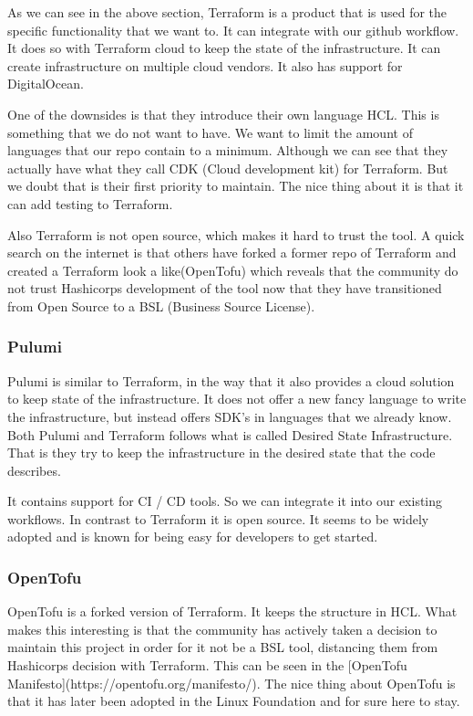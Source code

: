 As we can see in the above section, Terraform is a product that is used for the specific functionality that we want to. It can integrate with our github workflow. It does so with Terraform cloud to keep the state of the infrastructure. It can create infrastructure on multiple cloud vendors. It also has support for DigitalOcean.

One of the downsides is that they introduce their own language HCL. This is something that we do not want to have. We want to limit the amount of languages that our repo contain to a minimum. Although we can see that they actually have what they call CDK (Cloud development kit) for Terraform. But we doubt that is their first priority to maintain. The nice thing about it is that it can add testing to Terraform.

Also Terraform is not open source, which makes it hard to trust the tool. A quick search on the internet is that others have forked a former repo of Terraform and created a Terraform look a like(OpenTofu) which reveals that the community do not trust Hashicorps development of the tool now that they have transitioned from Open Source to a BSL (Business Source License).

\subsubsection{Pulumi}

Pulumi is similar to Terraform, in the way that it also provides a cloud solution to keep state of the infrastructure. It does not offer a new fancy language to write the infrastructure, but instead offers SDK’s in languages that we already know. Both Pulumi and Terraform follows what is called Desired State Infrastructure. That is they try to keep the infrastructure in the desired state that the code describes.

It contains support for CI / CD tools. So we can integrate it into our existing workflows. In contrast to Terraform it is open source. It seems to be widely adopted and is known for being easy for developers to get started. 

\subsubsection{OpenTofu}

OpenTofu is a forked version of Terraform. It keeps the structure in HCL. What makes this interesting is that the community has actively taken a decision to maintain this project in order for it not be a BSL tool, distancing them from Hashicorps decision with Terraform. This can be seen in the [OpenTofu Manifesto](https://opentofu.org/manifesto/). The nice thing about OpenTofu is that it has later been adopted in the Linux Foundation and for sure here to stay.

